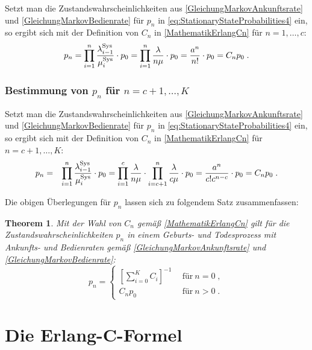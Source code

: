 \documentclass[a4paper,11pt,oneside]{article}
\newtheorem{theorem}{Theorem}
\theoremstyle{definition}
\begin{document}
Setzt man die Zustandswahrscheinlichkeiten aus \eqref{GleichungMarkovAnkunftsrate} und \eqref{GleichungMarkovBedienrate} für $p_n$ in \eqref{eq:StationaryStateProbabilities4} ein, so ergibt sich mit der Definition von $C_n$ in \eqref{MathematikErlangCn} für $n=1,\ldots,c$:
$$
p_n=
\prod_{i=1}^n\frac{\lambda_{i-1}^{\rm Sys}}{\mu_i^{\rm Sys}}\cdot p_0=
\prod_{i=1}^n\frac{\lambda}{n\mu}\cdot p_0=
\frac{a^n}{n!}\cdot p_0=
C_np_0\;.
$$

\subsubsection*{Bestimmung von $p_n$ für $n=c+1,\ldots,K$}

Setzt man die Zustandswahrscheinlichkeiten aus \eqref{GleichungMarkovAnkunftsrate} und \eqref{GleichungMarkovBedienrate} für $p_n$ in \eqref{eq:StationaryStateProbabilities4} ein, so ergibt sich mit der Definition von $C_n$ in \eqref{MathematikErlangCn} für $n=c+1,\ldots,K$:
\begin{eqnarray*}
p_n&=&
\prod_{i=1}^n\frac{\lambda_{i-1}^{\rm Sys}}{\mu_i^{\rm Sys}}\cdot p_0=
\prod_{i=1}^c\frac{\lambda}{n\mu}\cdot\prod_{i=c+1}^n\frac{\lambda}{c\mu}\cdot p_0=
\frac{a^n}{c!c^{n-c}}\cdot p_0=
C_np_0\;.
\end{eqnarray*}

Die obigen Überlegungen für $p_n$ lassen sich zu folgendem Satz zusammenfassen:

\begin{theorem}
Mit der Wahl von $C_n$ gemäß \eqref{MathematikErlangCn} gilt für die Zustandswahrscheinlichkeiten $p_n$ in einem Geburts- und Todesprozess mit Ankunfts- und Bedienraten gemäß \eqref{GleichungMarkovAnkunftsrate} und \eqref{GleichungMarkovBedienrate}:
\begin{equation}\label{MathematikPn}
p_n=\left\{\begin{array}{ll}
\displaystyle \left[\sum_{i=0}^KC_i\right]^{-1}&~~\textrm{für}~n=0\;,\\
\displaystyle C_n p_0&~~\textrm{für}~n>0\;.
\end{array}\right.
\end{equation}
\end{theorem}



\section{Die Erlang-C-Formel}\label{Result}
\end{document}
